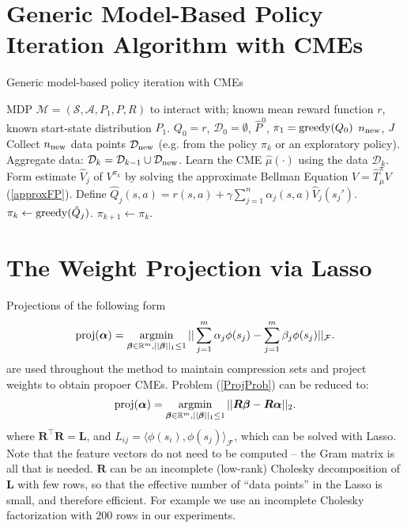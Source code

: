 \documentclass[letterpaper]{article}
\newcommand{\ShaweTaylorBook}{DBLP:books/daglib/0026002}
\newcommand{\cD}{{\mathcal D}}
\newcommand{\cF}{{\mathcal F}}
\newcommand{\cA}{{\mathcal A}}
\newcommand{\cS}{{\mathcal S}}
\newcommand{\cM}{{\mathcal M}}
\newcommand{\balpha}{{\bm \alpha}}
\newcommand{\bbeta}{{\bm \beta}}
\newcommand{\bL}{{\bm L}}
\newcommand{\bR}{{\bm R}}
\newcommand{\R}{{\mathbb R}}
\newcommand{\argmin}{\operatornamewithlimits{argmin}}
\newcommand{\greedy}{\operatornamewithlimits{greedy}}
\newcommand{\lang}{\langle}
\newcommand{\rang}{\rangle}
\newcommand{\nn}{\nonumber}
\begin{document}
\section{Generic Model-Based Policy Iteration Algorithm with CMEs} \label{GenericAlg}

\begin{algorithm}[htb]
   \caption{Generic model-based policy iteration with CMEs}
   \label{GenericPolIt}
\begin{algorithmic}
    MDP $\cM = (\cS,\cA,P_1,P,R)$ to interact with; known mean reward function $r$, known start-state distribution $P_1$.
	  $Q_0=r$, $\cD_0 = \emptyset$, $\hat P^0$, $\pi_1 = \greedy(Q_0)$
    $n_{\rm new}$, $J$\\
	  Collect $n_{\rm new}$ data points $\cD_{\rm new}$ (e.g. from the policy $\pi_k$ or an exploratory policy). Aggregate data: $\cD_k = \cD_{k-1}\cup\cD_{\rm new}$.
	  Learn the CME $\hat \mu(\cdot)$ using the data $\cD_k$.
    Form estimate $\hat V_j$ of $V^{\pi_k}$ by solving the approximate Bellman Equation $V =  \hat T^\pi_{\hat \mu} V$ (\ref{approxFP}). Define $\hat Q_j(s,a) = r(s,a) + \gamma \sum_{j=1}^n \alpha_j(s,a) \hat V_j(s_j')$.
	  $\pi_{k} \leftarrow \greedy(\hat Q_j)$. 
   \ENDFOR
	 \STATE $\pi_{k+1} \leftarrow \pi_{k} $.
	\ENDFOR
\end{algorithmic}
\end{algorithm}

\section{The Weight Projection via Lasso} \label{LassoSec}

Projections of the following form
\begin{align}
{\rm proj}(\balpha) = \argmin_{\bbeta \in \R^m, ||\bbeta||_1\le 1} || \sum_{j=1}^m \alpha_j \phi(s_j) - \sum_{j=1}^m \beta_j  \phi(s_j)  ||_{\cF}. \label{ProjProb}
\end{align}
are used throughout the method to maintain compression sets and project weights to obtain propoer CMEs. Problem (\ref{ProjProb}) can be reduced to:
\begin{align}
{\rm proj}(\balpha)  = \argmin_{\bbeta \in \R^m, ||\bbeta||_1\le 1} || \bR \bbeta - \bR \balpha ||_2. \nn
\end{align}
where $\bR^\top \bR = \bL$, and $L_{ij} = \lang \phi(s_i), \phi(s_j)\rang_\cF$, which can be solved with Lasso. Note that the feature vectors do not need to be computed -- the Gram matrix is all that is needed. $\bR$ can be an incomplete  (low-rank) Cholesky decomposition \cite[see e.g.][]{\ShaweTaylorBook} of $\bL$ with few rows, so that the effective number of ``data points'' in the Lasso is small, and therefore efficient. For example we use an incomplete Cholesky factorization with $200$ rows in our experiments.
\end{document}
